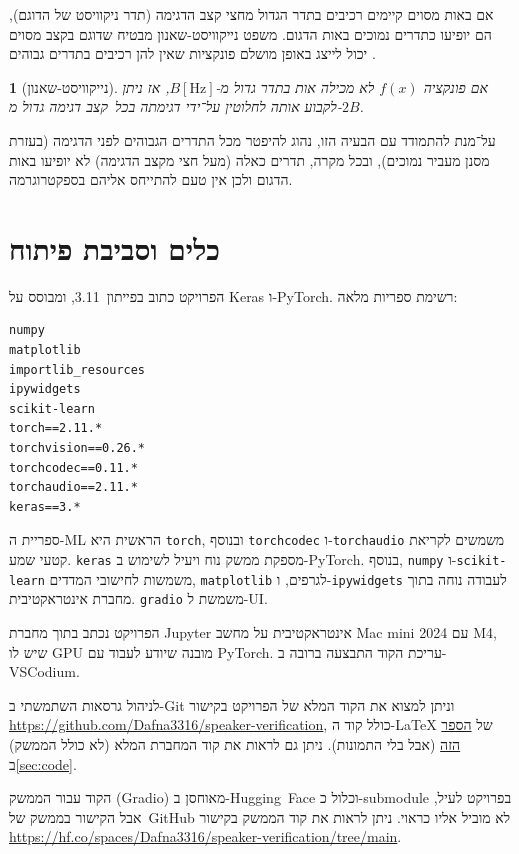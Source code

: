\documentclass[hebrew, a4paper]{article}
\theoremstyle{plain}
\newtheorem{theorem}{\theoremname}[section]
\theoremstyle{definition}
\numberwithin{equation}{section}
\begin{document}
אם באות מסוים קיימים רכיבים בתדר הגדול מחצי קצב הדגימה (תדר ניקוויסט
של הדוגם), הם יופיעו כתדרים נמוכים באות הדגום. משפט נייקוויסט-שאנון
מבטיח שדוגם בקצב מסוים יכול לייצג באופן מושלם פונקציות שאין להן רכיבים
בתדרים גבוהים .

\begin{theorem}[נייקוויסט-שאנון]\label{thm:nyquist-shannon}
  אם פונקציה $f(x)$ לא מכילה אות בתדר גדול מ-$B [\unit{\Hz}]$, אז ניתן
  לקבוע אותה לחלוטין על־ידי דגימתה בכל~קצב דגימה גדול מ-$2B$.
\end{theorem}

על־מנת להתמודד עם הבעיה הזו, נהוג להיפטר מכל התדרים הגבוהים לפני
הדגימה (בעזרת מסנן מעביר נמוכים), ובכל מקרה, תדרים כאלה (מעל חצי מקצב
הדגימה) לא יופיעו באות הדגום ולכן אין טעם להתייחס אליהם בספקטרוגרמה.

\section{כלים וסביבת פיתוח}
\label{sec:environment}

הפרויקט כתוב בפייתון~3.11, ומבוסס על Keras ו-PyTorch. רשימת ספריות
מלאה:
\begin{otherlanguage}{english}
\begin{verbatim}
numpy
matplotlib
importlib_resources
ipywidgets
scikit-learn
torch==2.11.*
torchvision==0.26.*
torchcodec==0.11.*
torchaudio==2.11.*
keras==3.*
\end{verbatim}
\end{otherlanguage}

ספריית ה-ML הראשית היא \verb|torch|, ובנוסף \verb|torchcodec|
ו-\verb|torchaudio| משמשים לקריאת קטעי שמע. \verb|keras| מספקת ממשק
נוח ויעיל לשימוש ב-PyTorch. בנוסף, \verb|numpy| ו-\verb|scikit-learn|
משמשות לחישובי המדדים, \verb|matplotlib| לגרפים, ו-\verb|ipywidgets|
לעבודה נוחה בתוך מחברת אינטראקטיבית. \verb|gradio| משמשת ל-UI.

הפרויקט נכתב בתוך מחברת Jupyter אינטראקטיבית על מחשב Mac mini 2024 עם
M4, שיש לו GPU מובנה שיודע לעבוד עם PyTorch. עריכת הקוד התבצעה ברובה
ב-VSCodium.

לניהול גרסאות השתמשתי ב-Git וניתן למצוא את הקוד המלא של הפרויקט בקישור
\url{https://github.com/Dafna3316/speaker-verification}, כולל קוד
ה-{\LaTeX} של
\href{https://github.com/Dafna3316/speaker-verification/blob/main/book/Book.tex}{הספר
  הזה} (אבל בלי התמונות). ניתן גם לראות את קוד המחברת המלא (לא כולל
הממשק) ב\autoref{sec:code}.

הקוד עבור הממשק (Gradio) מאוחסן ב-Hugging~Face וכלול כ-submodule
בפרויקט לעיל, אבל הקישור בממשק של~GitHub לא מוביל אליו כראוי. ניתן
לראות את קוד הממשק בקישור
\url{https://hf.co/spaces/Dafna3316/speaker-verification/tree/main}.
\end{document}

